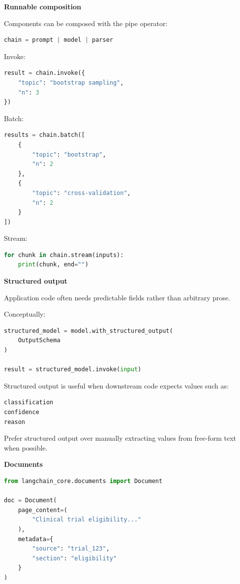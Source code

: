 \documentclass[11pt,letterpaper]{article}
\begin{document}
\textbf{Runnable composition}

Components can be composed with the pipe operator:

\begin{lstlisting}[language=Python]
chain = prompt | model | parser
\end{lstlisting}

Invoke:

\begin{lstlisting}[language=Python]
result = chain.invoke({
    "topic": "bootstrap sampling",
    "n": 3
})
\end{lstlisting}

Batch:

\begin{lstlisting}[language=Python]
results = chain.batch([
    {
        "topic": "bootstrap",
        "n": 2
    },
    {
        "topic": "cross-validation",
        "n": 2
    }
])
\end{lstlisting}

Stream:

\begin{lstlisting}[language=Python]
for chunk in chain.stream(inputs):
    print(chunk, end="")
\end{lstlisting}

\textbf{Structured output}

Application code often needs predictable fields rather than arbitrary prose.

Conceptually:

\begin{lstlisting}[language=Python]
structured_model = model.with_structured_output(
    OutputSchema
)

result = structured_model.invoke(input)
\end{lstlisting}

Structured output is useful when downstream code expects values such as:

\begin{lstlisting}
classification
confidence
reason
\end{lstlisting}

Prefer structured output over manually extracting values from free-form text
when possible.

\textbf{Documents}

\begin{lstlisting}[language=Python]
from langchain_core.documents import Document

doc = Document(
    page_content=(
        "Clinical trial eligibility..."
    ),
    metadata={
        "source": "trial_123",
        "section": "eligibility"
    }
)
\end{lstlisting}
\end{document}
